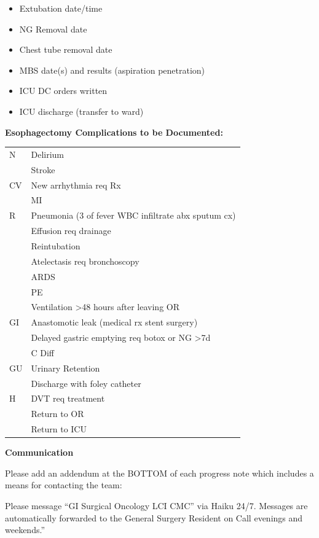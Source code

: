 \documentclass[
]{book}
\providecommand{\tightlist}{%
  \setlength{\itemsep}{0pt}\setlength{\parskip}{0pt}}
\begin{document}
\begin{itemize}
\tightlist
\item
  Extubation date/time
\item
  NG Removal date
\item
  Chest tube removal date
\item
  MBS date(s) and results (aspiration \textbar{} penetration)
\item
  ICU DC orders written
\item
  ICU discharge (transfer to ward)
\end{itemize}

\textbf{Esophagectomy Complications to be Documented:}

\begin{longtable}[]{@{}ll@{}}
\toprule\noalign{}
\endhead
\bottomrule\noalign{}
\endlastfoot
N & Delirium \\
& Stroke \\
CV & New arrhythmia req Rx \\
& MI \\
R & Pneumonia (3 of fever \textbar{} WBC \textbar{} infiltrate \textbar{} abx \textbar{} sputum cx) \\
& Effusion req drainage \\
& Reintubation \\
& Atelectasis req bronchoscopy \\
& ARDS \\
& PE \\
& Ventilation \textgreater48 hours after leaving OR \\
GI & Anastomotic leak (medical rx \textbar{} stent \textbar{} surgery) \\
& Delayed gastric emptying req botox or NG \textgreater7d \\
& C Diff \\
GU & Urinary Retention \\
& Discharge with foley catheter \\
H & DVT req treatment \\
& Return to OR \\
& Return to ICU \\
\end{longtable}

\textbf{Communication}

Please add an addendum at the BOTTOM of each progress note which includes a means for contacting the team:

Please message ``GI Surgical Oncology LCI CMC'' via Haiku 24/7. Messages are automatically forwarded to the General Surgery Resident on Call evenings and weekends.''
\end{document}
